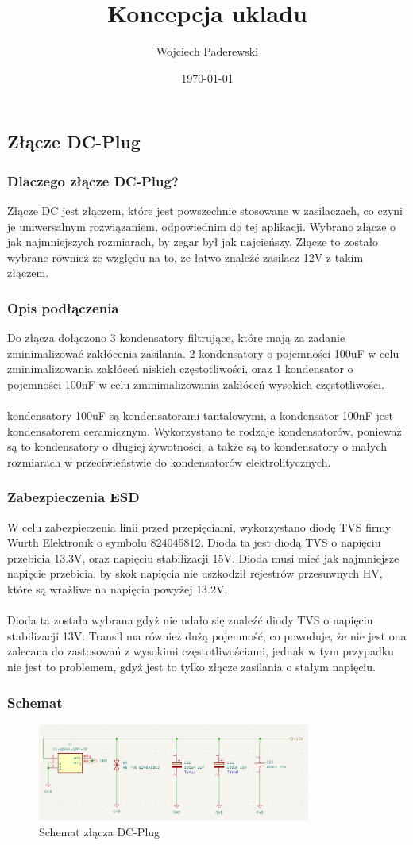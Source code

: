 \documentclass[../main.tex]{subfiles}
\author{Wojciech Paderewski}
\date{\today}
\title{Koncepcja ukladu}
\begin{document}
\subsection{Złącze DC-Plug}
\subsubsection{Dlaczego złącze DC-Plug?}
Złącze DC jest złączem, które jest powszechnie stosowane w zasilaczach, co czyni je uniwersalnym rozwiązaniem, odpowiednim do tej aplikacji.
Wybrano złącze o jak najmniejszych rozmiarach, by zegar był jak najcieńszy. Złącze to zostało wybrane również ze względu na to, że łatwo znaleźć zasilacz 12V z takim złączem.

\subsubsection{Opis podłączenia}
Do złącza dołączono 3 kondensatory filtrujące, które mają za zadanie zminimalizować zakłócenia zasilania. 2 kondensatory o 
pojemności 100uF w celu zminimalizowania zakłóceń niskich częstotliwości, oraz 1 kondensator o pojemności 100nF w celu zminimalizowania zakłóceń wysokich częstotliwości.
\\\\
kondensatory 100uF są kondensatorami tantalowymi, a kondensator 100nF jest kondensatorem ceramicznym. Wykorzystano te rodzaje kondensatorów, 
ponieważ są to kondensatory o długiej żywotności, a także są to kondensatory o małych rozmiarach w przeciwieństwie do kondensatorów elektrolitycznych.

\subsubsection{Zabezpieczenia ESD}

W celu zabezpieczenia linii przed przepięciami, wykorzystano diodę TVS firmy Wurth Elektronik o symbolu 824045812. Dioda ta jest diodą TVS o napięciu przebicia 13.3V,
oraz napięciu stabilizacji 15V. Dioda musi mieć jak najmniejsze napięcie przebicia, by skok napięcia nie uszkodził rejestrów przesuwnych HV, które są wrażliwe na napięcia powyżej 13.2V.
\\\\
Dioda ta została wybrana gdyż nie udało się znaleźć diody TVS o napięciu stabilizacji 13V. Transil ma również dużą pojemność, co powoduje, że nie jest ona zalecana do 
zastosowań z wysokimi częstotliwościami, jednak w tym przypadku nie jest to problemem, gdyż jest to tylko złącze zasilania o stałym napięciu.

\subsubsection{Schemat}
\begin{figure}[H]
    \centering
    \includegraphics[width=0.8\textwidth]{DcPlug_schemat.png}
    \caption{Schemat złącza DC-Plug}
\end{figure}
\end{document}
